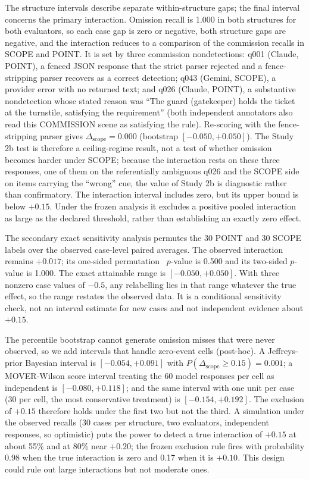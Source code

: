 \documentclass{ieeeaccess}
\newcommand{\Dscope}{\Delta_{\mathrm{scope}}}
\begin{document}
The structure intervals describe separate within-structure gaps; the final interval concerns the primary interaction. Omission recall is 1.000 in both structures for both evaluators, so each case gap is zero or negative, both structure gaps are negative, and the interaction reduces to a comparison of the commission recalls in SCOPE and POINT. It is set by three commission nondetections: q001 (Claude, POINT), a fenced JSON response that the strict parser rejected and a fence-stripping parser recovers as a correct detection; q043 (Gemini, SCOPE), a provider error with no returned text; and q026 (Claude, POINT), a substantive nondetection whose stated reason was ``The guard (gatekeeper) holds the ticket at the turnstile, satisfying the requirement'' (both independent annotators also read this COMMISSION scene as satisfying the rule). Re-scoring with the fence-stripping parser gives $\Dscope=0.000$ (bootstrap $[-0.050,+0.050]$). The Study 2b test is therefore a ceiling-regime result, not a test of whether omission becomes harder under SCOPE; because the interaction rests on these three responses, one of them on the referentially ambiguous q026 and the SCOPE side on items carrying the ``wrong'' cue, the value of Study 2b is diagnostic rather than confirmatory. The interaction interval includes zero, but its upper bound is below $+0.15$. Under the frozen analysis it excludes a positive pooled interaction as large as the declared threshold, rather than establishing an exactly zero effect.

The secondary exact sensitivity analysis permutes the 30 POINT and 30 SCOPE labels over the observed case-level paired averages. The observed interaction remains $+0.017$; its one-sided permutation~\cite{good2005permutation} $p$-value is 0.500 and its two-sided $p$-value is 1.000. The exact attainable range is $[-0.050,+0.050]$. With three nonzero case values of $-0.5$, any relabelling lies in that range whatever the true effect, so the range restates the observed data. It is a conditional sensitivity check, not an interval estimate for new cases and not independent evidence about $+0.15$.

The percentile bootstrap cannot generate omission misses that were never observed, so we add intervals that handle zero-event cells (post-hoc). A Jeffreys-prior Bayesian interval is $[-0.054,+0.091]$ with $P(\Dscope\ge0.15)=0.001$; a MOVER-Wilson score interval treating the 60 model responses per cell as independent is $[-0.080,+0.118]$; and the same interval with one unit per case (30 per cell, the most conservative treatment) is $[-0.154,+0.192]$. The exclusion of $+0.15$ therefore holds under the first two but not the third. A simulation under the observed recalls (30 cases per structure, two evaluators, independent responses, so optimistic) puts the power to detect a true interaction of $+0.15$ at about 55\% and at 80\% near $+0.20$; the frozen exclusion rule fires with probability 0.98 when the true interaction is zero and 0.17 when it is $+0.10$. This design could rule out large interactions but not moderate ones.
\end{document}
